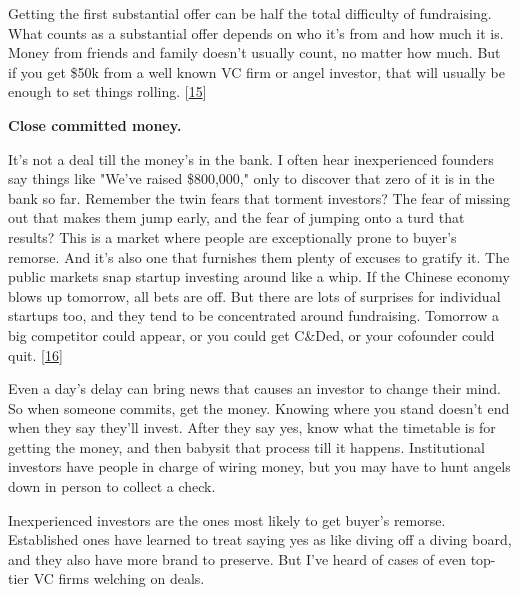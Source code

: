 Getting
                    the first substantial offer can be half the total difficulty
                    of fundraising. What counts as a substantial offer depends
                    on who it's from and how much it is. Money from friends and
                    family doesn't usually count, no matter how much. But if you
                    get \$50k from a well known VC firm or angel investor, that
                    will usually be enough to set things rolling.
                    [\href{\#f15n}{15}]


                    \textbf{Close committed money.}

It's not a deal
                    till the money's in the bank. I often hear inexperienced
                    founders say things like "We've raised \$800,000," only to
                    discover that zero of it is in the bank so far. Remember the
                    twin fears that torment investors? The fear of missing out
                    that makes them jump early, and the fear of jumping onto a
                    turd that results? This is a market where people are
                    exceptionally prone to buyer's remorse. And it's also one
                    that furnishes them plenty of excuses to gratify it. The
                    public markets snap startup investing around like a whip. If
                    the Chinese economy blows up tomorrow, all bets are off. But
                    there are lots of surprises for individual startups too, and
                    they tend to be concentrated around fundraising. Tomorrow a
                    big competitor could appear, or you could get C\&Ded, or your
                    cofounder could quit.
                    [\href{\#f16n}{16}]

Even a day's delay can bring news that causes
                    an investor to change their mind. So when someone commits,
                    get the money. Knowing where you stand doesn't end when they
                    say they'll invest. After they say yes, know what the
                    timetable is for getting the money, and then babysit that
                    process till it happens. Institutional investors have people
                    in charge of wiring money, but you may have to hunt angels
                    down in person to collect a check.

Inexperienced
                    investors are the ones most likely to get buyer's remorse.
                    Established ones have learned to treat saying yes as like
                    diving off a diving board, and they also have more brand to
                    preserve. But I've heard of cases of even top-tier VC firms
                    welching on deals.


